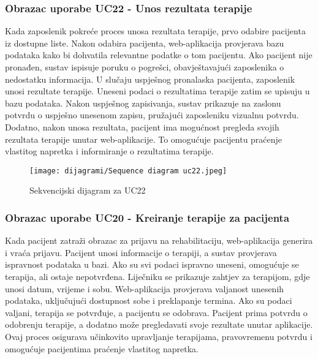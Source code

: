 \eject

\subsubsection{Obrazac uporabe UC22 - Unos rezultata terapije}

Kada zaposlenik pokreće proces unosa rezultata terapije, prvo odabire pacijenta iz dostupne liste. Nakon odabira pacijenta, web-aplikacija provjerava bazu podataka kako bi dohvatila relevantne podatke o tom pacijentu. Ako pacijent nije pronađen, sustav ispisuje poruku o pogrešci, obavještavajući zaposlenika o nedostatku informacija. U slučaju uspješnog pronalaska pacijenta, zaposlenik unosi rezultate terapije. Uneseni podaci o rezultatima terapije zatim se upisuju u bazu podataka. Nakon uspješnog zapisivanja, sustav prikazuje na zaslonu potvrdu o uspješno unesenom zapisu, pružajući zaposleniku vizualnu potvrdu. Dodatno, nakon unosa rezultata, pacijent ima mogućnost pregleda svojih rezultata terapije unutar web-aplikacije. To omogućuje pacijentu praćenje vlastitog napretka i informiranje o rezultatima terapije. 

\begin{figure}[H]
	\texttt{[image: dijagrami/Sequence diagram uc22.jpeg]}
	\centering
	\caption{Sekvencijski dijagram za UC22}
	\label{fig:SequenceDiagram2}
\end{figure}

\eject

\subsubsection{Obrazac uporabe UC20 - Kreiranje terapije za pacijenta}


Kada pacijent zatraži obrazac za prijavu na rehabilitaciju, web-aplikacija generira i vraća prijavu. Pacijent unosi informacije o terapiji, a sustav provjerava ispravnost podataka u bazi. Ako su svi podaci ispravno uneseni, omogućuje se terapija, ali ostaje nepotvrđena. Liječniku se prikazuje zahtjev za terapijom, gdje unosi datum, vrijeme i sobu. Web-aplikacija provjerava valjanost unesenih podataka, uključujući dostupnost sobe i preklapanje termina. Ako su podaci valjani, terapija se potvrđuje, a pacijentu se odobrava. Pacijent prima potvrdu o odobrenju terapije, a dodatno može pregledavati svoje rezultate unutar aplikacije. Ovaj proces osigurava učinkovito upravljanje terapijama, pravovremenu potvrdu i omogućuje pacijentima praćenje vlastitog napretka.


